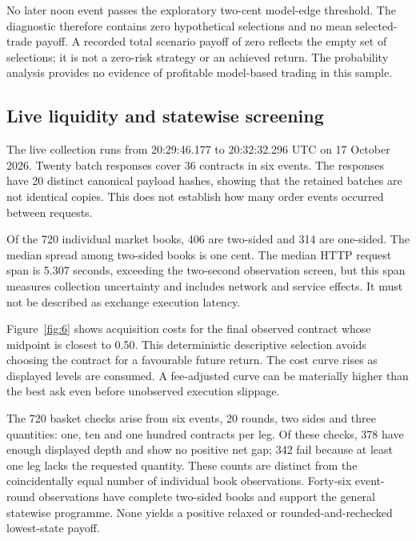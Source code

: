 
No later noon event passes the exploratory two-cent model-edge threshold. The diagnostic therefore contains zero hypothetical selections and no mean selected-trade payoff. A recorded total scenario payoff of zero reflects the empty set of selections; it is not a zero-risk strategy or an achieved return. The probability analysis provides no evidence of profitable model-based trading in this sample.

\subsection{Live liquidity and statewise screening}
The live collection runs from 20:29:46.177 to 20:32:32.296 UTC on 17 October 2026. Twenty batch responses cover 36 contracts in six events. The responses have 20 distinct canonical payload hashes, showing that the retained batches are not identical copies. This does not establish how many order events occurred between requests.


Of the 720 individual market books, 406 are two-sided and 314 are one-sided. The median spread among two-sided books is one cent. The median HTTP request span is 5.307 seconds, exceeding the two-second observation screen, but this span measures collection uncertainty and includes network and service effects. It must not be described as exchange execution latency.

Figure~\ref{fig:6} shows acquisition costs for the final observed contract whose midpoint is closest to 0.50. This deterministic descriptive selection avoids choosing the contract for a favourable future return. The cost curve rises as displayed levels are consumed. A fee-adjusted curve can be materially higher than the best ask even before unobserved execution slippage.


The 720 basket checks arise from six events, 20 rounds, two sides and three quantities: one, ten and one hundred contracts per leg. Of these checks, 378 have enough displayed depth and show no positive net gap; 342 fail because at least one leg lacks the requested quantity. These counts are distinct from the coincidentally equal number of individual book observations. Forty-six event-round observations have complete two-sided books and support the general statewise programme. None yields a positive relaxed or rounded-and-rechecked lowest-state payoff.

